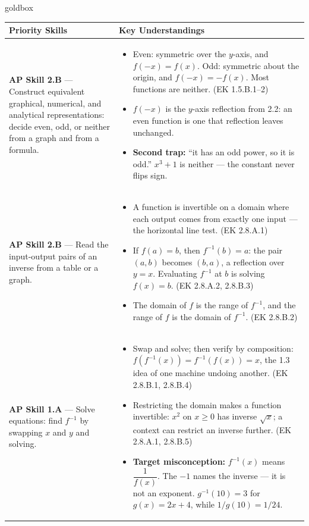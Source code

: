 \documentclass[10pt]{article}
\begin{document}
\renewcommand{\arraystretch}{1.6}
\begin{skillbox}{goldbox}
\begin{tabularx}{\linewidth}{@{}X X@{}}
\textbf{Priority Skills} &
\textbf{Key Understandings} \\
\midrule
\textbf{AP Skill 2.B} --- Construct equivalent graphical, numerical, and analytical
representations: decide even, odd, or neither from a graph and from a formula. &
\begin{itemize}[leftmargin=1.2em,itemsep=2pt,topsep=0pt]
  \item Even: symmetric over the $y$-axis, and $f(-x) = f(x)$. Odd: symmetric about the
        origin, and $f(-x) = -f(x)$. Most functions are neither. (EK 1.5.B.1--2)
  \item $f(-x)$ is the $y$-axis reflection from 2.2: an even function is one that reflection
        leaves unchanged.
  \item \textbf{Second trap:} ``it has an odd power, so it is odd.'' $x^3 + 1$ is neither ---
        the constant never flips sign.
\end{itemize} \\
\textbf{AP Skill 2.B} --- Read the input-output pairs of an inverse from a table or a graph. &
\begin{itemize}[leftmargin=1.2em,itemsep=2pt,topsep=0pt]
  \item A function is invertible on a domain where each output comes from exactly one input ---
        the horizontal line test. (EK 2.8.A.1)
  \item If $f(a) = b$, then $f^{-1}(b) = a$: the pair $(a, b)$ becomes $(b, a)$, a reflection
        over $y = x$. Evaluating $f^{-1}$ at $b$ is solving $f(x) = b$. (EK 2.8.A.2, 2.8.B.3)
  \item The domain of $f$ is the range of $f^{-1}$, and the range of $f$ is the domain of
        $f^{-1}$. (EK 2.8.B.2)
\end{itemize} \\
\textbf{AP Skill 1.A} --- Solve equations: find $f^{-1}$ by swapping $x$ and $y$ and solving. &
\begin{itemize}[leftmargin=1.2em,itemsep=2pt,topsep=0pt]
  \item Swap and solve; then verify by composition: $f(f^{-1}(x)) = f^{-1}(f(x)) = x$, the
        1.3 idea of one machine undoing another. (EK 2.8.B.1, 2.8.B.4)
  \item Restricting the domain makes a function invertible: $x^2$ on $x \ge 0$ has inverse
        $\sqrt{x}$; a context can restrict an inverse further. (EK 2.8.A.1, 2.8.B.5)
  \item \textbf{Target misconception:} $f^{-1}(x)$ means $\dfrac{1}{f(x)}$. The $-1$ names
        the inverse --- it is not an exponent. $g^{-1}(10) = 3$ for $g(x) = 2x + 4$, while
        $1/g(10) = 1/24$.
\end{itemize} \\
\end{tabularx}
\end{skillbox}
\end{document}

